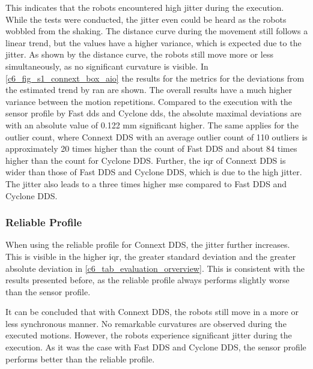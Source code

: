 This indicates that the robots encountered high jitter during the execution. While the tests were conducted, the jitter even could be heard as the robots wobbled from the shaking. The distance curve during the movement still follows a linear trend, but the values have a higher variance, which is expected due to the jitter. As shown by the distance curve, the robots still move more or less simultaneously, as no significant curvature is visible.\newline
In \autoref{c6_fig_s1_connext_box_aio} the results for the metrics for the deviations from the estimated trend by \gls{ran} are shown. The overall results have a much higher variance between the motion repetitions. Compared to the execution with the sensor profile by Fast \gls{dds} and Cyclone \gls{dds}, the absolute maximal deviations are with an absolute value of 0.122 \si{\milli\meter} significant higher. The same applies for the outlier count, where Connext DDS with an average outlier count of 110 outliers is approximately 20 times higher than the count of Fast DDS and about 84 times higher than the count for Cyclone DDS. Further, the \gls{iqr} of Connext DDS is wider than those of Fast DDS and Cyclone DDS, which is due to the high jitter. The jitter also leads to a three times higher \gls{mse} compared to Fast DDS and Cyclone DDS.

\subsubsection{Reliable Profile}
When using the reliable profile for Connext DDS, the jitter further increases. This is visible in the higher \gls{iqr}, the greater standard deviation and the greater absolute deviation in \autoref{c6_tab_evaluation_orverview}. This is consistent with the results presented before, as the reliable profile always performs slightly worse than the sensor profile.

It can be concluded that with Connext DDS, the robots still move in a more or less synchronous manner. No remarkable curvatures are observed during the executed motions. However, the robots experience significant jitter during the execution. As it was the case with Fast DDS and Cyclone DDS, the sensor profile performs better than the reliable profile.
